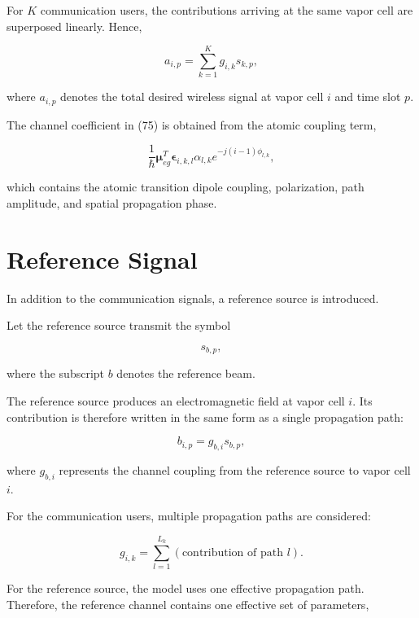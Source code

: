 \documentclass[12pt,a4paper]{article}
\begin{document}
For $K$ communication users, the contributions arriving at the same vapor cell are superposed linearly. Hence,

\begin{equation}
a_{i,p}
=
\sum_{k=1}^{K}
g_{i,k}s_{k,p},
\tag{80}
\end{equation}

where $a_{i,p}$ denotes the total desired wireless signal at vapor cell $i$ and time slot $p$.

The channel coefficient in (75) is obtained from the atomic coupling term,

\begin{equation}
\frac{1}{\hbar}
\boldsymbol{\mu}_{eg}^{T}
\boldsymbol{\epsilon}_{i,k,l}
\alpha_{l,k}
e^{-j(i-1)\phi_{l,k}},
\tag{81}
\end{equation}

which contains the atomic transition dipole coupling, polarization, path amplitude, and spatial propagation phase.

\section{Reference Signal}

In addition to the communication signals, a reference source is introduced.

Let the reference source transmit the symbol

\begin{equation}
s_{b,p},
\tag{82}
\end{equation}

where the subscript $b$ denotes the reference beam.

The reference source produces an electromagnetic field at vapor cell $i$. Its contribution is therefore written in the same form as a single propagation path:

\begin{equation}
b_{i,p}
=
g_{b,i}s_{b,p},
\tag{83}
\end{equation}

where $g_{b,i}$ represents the channel coupling from the reference source to vapor cell $i$.

For the communication users, multiple propagation paths are considered:

\begin{equation}
g_{i,k}
=
\sum_{l=1}^{L_k}
\left(
\text{contribution of path }l
\right).
\tag{84}
\end{equation}

For the reference source, the model uses one effective propagation path. Therefore, the reference channel contains one effective set of parameters,
\end{document}
